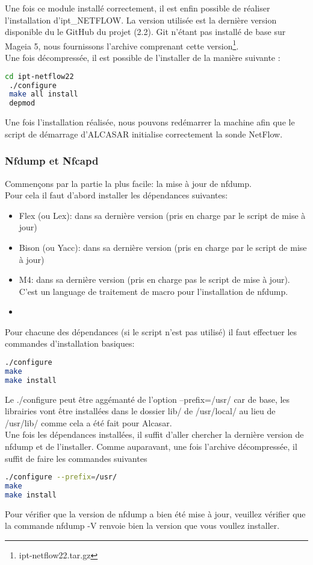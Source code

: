 Une fois ce module installé correctement, il est enfin possible de réaliser l'installation d'ipt\_NETFLOW. La version utilisée est la dernière version disponible du le GitHub du projet (2.2). Git n'étant pas installé de base sur Mageia 5, nous fournissons l'archive comprenant cette version\footnote{ipt-netflow22.tar.gz}.\\
Une fois décompressée, il est possible de l'installer de la manière suivante :
\begin{lstlisting}[language=bash,style=custombash]
 cd ipt-netflow22
 ./configure
 make all install
 depmod
\end{lstlisting}
Une fois l'installation réalisée, nous pouvons redémarrer la machine afin que le script de démarrage d'ALCASAR initialise correctement la sonde NetFlow.

\subsubsection{Nfdump et Nfcapd}
Commençons par la partie la plus facile: la mise à jour de nfdump.\\
Pour cela il faut d'abord installer les dépendances suivantes:
\begin{itemize}
\item Flex (ou Lex): dans sa dernière version (pris en charge par le script de mise à jour)
\item Bison (ou Yacc): dans sa dernière version (pris en charge par le script de mise à jour)
\item M4: dans sa dernière version (pris en charge pas le script de mise à jour). C'est un language de traitement de macro pour l'installation de nfdump.
\item 
\end{itemize}
Pour chacune des dépendances (si le script n'est pas utilisé) il faut effectuer les commandes d'installation basiques:
\begin{lstlisting}[language=bash,style=custombash]
./configure 
make
make install
\end{lstlisting}
Le ./configure peut être aggémanté de l'option --prefix=/usr/ car de base, les librairies vont être installées dans le dossier lib/ de /usr/local/ au lieu de /usr/lib/ comme cela a été fait pour Alcasar.\\
Une fois les dépendances installées, il suffit d'aller chercher la dernière version de nfdump et de l'installer. Comme auparavant, une fois l'archive décompressée, il suffit de faire les commandes suivantes
\begin{lstlisting}[language=bash,style=custombash]
./configure --prefix=/usr/
make
make install
\end{lstlisting}
Pour vérifier que la version de nfdump a bien été mise à jour, veuillez vérifier que la commande nfdump -V renvoie bien la version que vous voullez installer.


